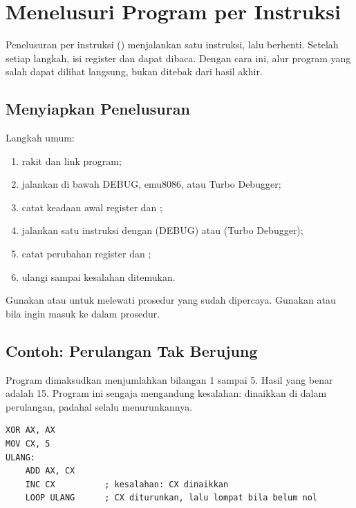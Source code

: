 \section{Menelusuri Program per Instruksi}
\label{sec:trace}

Penelusuran per instruksi () menjalankan satu
instruksi, lalu berhenti. Setelah setiap langkah, isi register dan
 dapat dibaca. Dengan cara ini, alur program yang salah
dapat dilihat langsung, bukan ditebak dari hasil akhir.

\subsection{Menyiapkan Penelusuran}

Langkah umum:

\begin{enumerate}
    \item rakit dan link program;
    \item jalankan di bawah DEBUG, emu8086, atau Turbo Debugger;
    \item catat keadaan awal register dan ;
    \item jalankan satu instruksi dengan  (DEBUG) atau
           (Turbo Debugger);
    \item catat perubahan register dan ;
    \item ulangi sampai kesalahan ditemukan.
\end{enumerate}

Gunakan  atau  untuk melewati prosedur yang sudah
dipercaya. Gunakan  atau  bila ingin masuk ke dalam
prosedur.

\subsection{Contoh: Perulangan Tak Berujung}

Program  dimaksudkan menjumlahkan bilangan 1
sampai 5. Hasil yang benar adalah 15. Program ini sengaja mengandung
kesalahan:  dinaikkan di dalam perulangan, padahal
 selalu menurunkannya.

\begin{lstlisting}[language=MASM, numbers=none]
XOR AX, AX
MOV CX, 5
ULANG:
    ADD AX, CX
    INC CX          ; kesalahan: CX dinaikkan
    LOOP ULANG      ; CX diturunkan, lalu lompat bila belum nol
\end{lstlisting}

